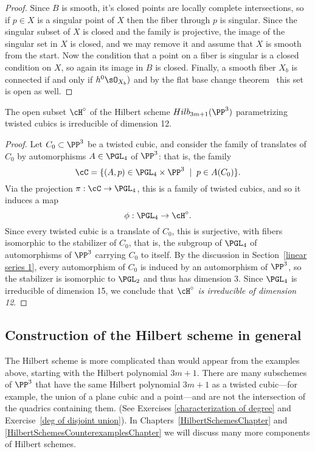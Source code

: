 \begin{proof}
Since $B$ is smooth, it's closed points are locally complete intersections, so if $p\in X$ is a singular point of $X$ then the fiber through $p$ is singular. Since the singular subset of $X$ is closed and the family is projective, the image of the singular set in $X$ is closed, and we may remove it and assume that $X$ is smooth from the start. Now the condition that a point on a fiber is singular is a closed condition on $X$, so again its image in $B$ is closed. Finally, a smooth fiber $X_b$ is connected if and only if $h^0\sO_{X_b})$ and by the flat base change theorem~\cite[***]{Hartshorne1977} this set is open as well.
\end{proof}


\begin{proposition}\label{hilb of twisted cubics}
The open subset $\cH^\circ$ of the Hilbert scheme $Hilb_{3m+1}(\PP^3)$ parametrizing twisted cubics is irreducible of dimension 12.
\end{proposition}

\begin{proof}  Let $C_0 \subset \PP^3$ be a twisted cubic, and consider the family of translates of $C_0$ by automorphisms $A \in \PGL_4$ of $\PP^3$: that is, the family
$$
\cC = \{ (A, p) \in \PGL_4 \times \PP^3 \; \mid \; p \in A(C_0) \}.
$$
Via the projection $\pi : \cC \to \PGL_4$, this is a family of twisted cubics, and so it induces a map
$$
\phi : \PGL_4 \to \cH^\circ.
$$
Since every twisted cubic is a translate of $C_0$, this is surjective, with fibers isomorphic to the stabilizer of $C_0$, that is, the subgroup of $\PGL_4$ of automorphisms of $\PP^3$ carrying $C_0$ to itself. By the discussion in Section~\ref{linear series 1}, every automorphism of $C_{0}$ is induced by an automorphism of $\PP^{3}$, so the stabilizer is isomorphic to $\PGL_2$ and  thus has dimension 3. Since $\PGL_4$ is irreducible of dimension 15, we conclude that \emph{$\cH^\circ$ is irreducible of dimension 12}.
\end{proof}


\subsection{Construction of the Hilbert scheme in general}

The Hilbert scheme is more complicated than would appear from the examples above, starting with the Hilbert polynomial $3m+1$. There are many subschemes of $\PP^3$ that have the same Hilbert polynomial $3m+1$ as a twisted cubic---for example, the union of a plane cubic and a point---and are not the intersection of the quadrics containing them. (See Exercises \ref{characterization of degree} and Exercise~\ref{deg of disjoint union}). In Chapters~\ref{HilbertSchemesChapter}
and \ref{HilbertSchemesCounterexamplesChapter} we will discuss many more components of Hilbert schemes.


